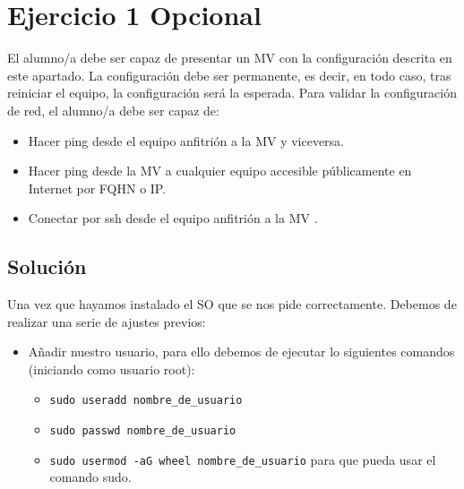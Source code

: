 
\section{Ejercicio 1 Opcional}
El alumno/a debe ser capaz de presentar un MV con la configuración descrita en este apartado. La configuración debe ser permanente, es decir, en todo caso, tras reiniciar el equipo, la configuración será la esperada.
Para validar la configuración de red, el alumno/a debe ser capaz de:
\begin{itemize}
    \item Hacer ping desde el equipo anfitrión a la MV y viceversa.
    \item Hacer ping desde la MV a cualquier equipo accesible públicamente en Internet por FQHN o IP.
    \item Conectar por ssh desde el equipo anfitrión a la MV .
\end{itemize}

\subsection{Solución}
Una vez que hayamos instalado el SO que se nos pide correctamente. Debemos de realizar una serie de ajustes previos:
\begin{itemize}
    \item Añadir nuestro usuario, para ello debemos de ejecutar lo siguientes comandos (iniciando como usuario root):
    \begin{itemize}
        \item \texttt{sudo useradd nombre\_de\_usuario}        
        \item \texttt{sudo passwd nombre\_de\_usuario}
        \item \texttt{sudo usermod -aG wheel nombre\_de\_usuario} para que pueda usar el comando sudo.
    \end{itemize}
\end{itemize}

